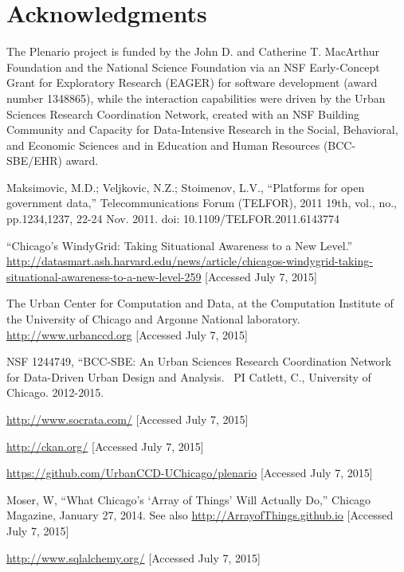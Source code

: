 \documentclass[11pt]{article}
\begin{document}
\section*{Acknowledgments}
The Plenario project is funded by the John D. and Catherine T. MacArthur Foundation and the National Science Foundation via an NSF Early-Concept Grant for Exploratory Research (EAGER) for software development (award number 1348865), while the interaction capabilities were driven by the Urban Sciences Research Coordination Network, created with an NSF Building Community and Capacity for Data-Intensive Research in the Social, Behavioral, and Economic Sciences and in Education and Human Resources (BCC-SBE/EHR) award.




\begin{thebibliography}{1}

Maksimovic, M.D.; Veljkovic, N.Z.; Stoimenov, L.V., ``Platforms for open government data,'' Telecommunications Forum (TELFOR), 2011 19th, vol., no., pp.1234,1237, 22-24 Nov. 2011. doi: 10.1109/TELFOR.2011.6143774

``Chicago's WindyGrid: Taking Situational Awareness to a New Level.'' \url{http://datasmart.ash.harvard.edu/news/article/chicagos-windygrid-taking-situational-awareness-to-a-new-level-259} [Accessed July 7, 2015]

The Urban Center for Computation and Data, at the Computation Institute of the University of Chicago and Argonne National laboratory. \url{http://www.urbanccd.org} [Accessed July 7, 2015]

NSF 1244749, ``BCC-SBE: An Urban Sciences Research Coordination Network for Data-Driven Urban Design and Analysis. \ PI Catlett, C., University of Chicago. 2012-2015.

\url{http://www.socrata.com/} [Accessed July 7, 2015]

\url{http://ckan.org/} [Accessed July 7, 2015]

\url{https://github.com/UrbanCCD-UChicago/plenario} [Accessed July 7, 2015]

Moser, W, ``What Chicago's `Array of Things' Will Actually Do,'' Chicago Magazine, January 27, 2014. See also \url{http://ArrayofThings.github.io} [Accessed July 7, 2015]

\url{http://www.sqlalchemy.org/} [Accessed July 7, 2015]


\end{thebibliography}
\end{document}
